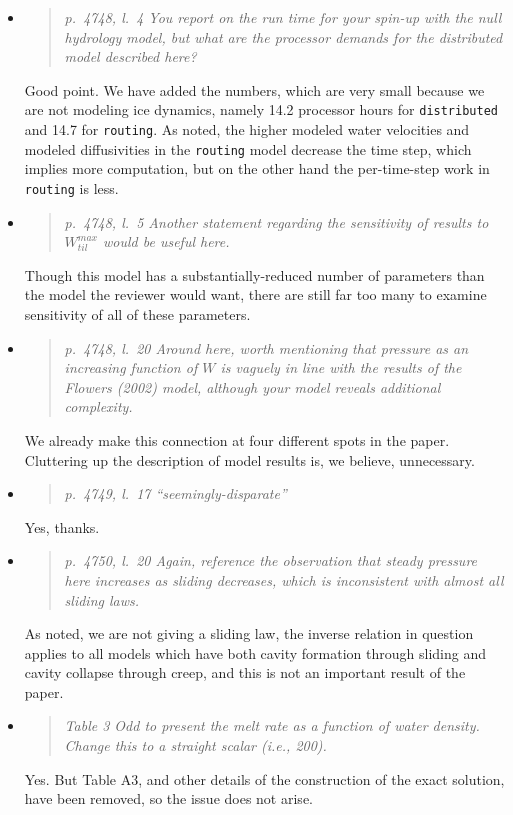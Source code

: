 \documentclass[11pt,reqno]{amsart}
\newcommand{\reply}[2]{
\medskip\medskip
\item  \begin{quote}
\emph{#1}
\end{quote}

\medskip
\noindent #2}
\begin{document}
\begin{itemize}
\reply{p.~4748, l.~4 You report on the run time for your spin-up with the null hydrology model, but what are the processor demands for the distributed model described here?}
{Good point.  We have added the numbers, which are very small because we are not modeling ice dynamics, namely 14.2 processor hours for \texttt{distributed} and 14.7 for \texttt{routing}.  As noted, the higher modeled water velocities and modeled diffusivities in the \texttt{routing} model decrease the time step, which implies more computation, but on the other hand the per-time-step work in \texttt{routing} is less.}

\reply{p.~4748, l.~5 Another statement regarding the sensitivity of results to $W_{til}^{max}$ would be useful here.}
{Though this model has a substantially-reduced number of parameters than the model the reviewer would want, there are still far too many to examine sensitivity of all of these parameters.}

\reply{p.~4748, l.~20 Around here, worth mentioning that pressure as an increasing function of $W$ is vaguely in line with the results of the Flowers (2002) model, although your model reveals additional complexity.}
{We already make this connection at four different spots in the paper.  Cluttering up the description of model results is, we believe, unnecessary.}

\reply{p.~4749, l.~17 ``seemingly-disparate''}
{Yes, thanks.}

\reply{p.~4750, l.~20 Again, reference the observation that steady pressure here increases as sliding decreases, which is inconsistent with almost all sliding laws.}
{As noted, we are not giving a sliding law, the inverse relation in question applies to all models which have both cavity formation through sliding and cavity collapse through creep, and this is not an important result of the paper.}

\reply{Table 3 Odd to present the melt rate as a function of water density. Change this to a
straight scalar (i.e., 200).}
{Yes.  But Table A3, and other details of the construction of the exact solution, have been removed, so the issue does not arise.}
\end{itemize}
\end{document}
